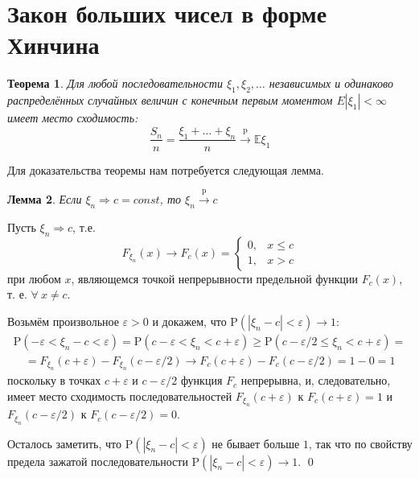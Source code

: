 \documentclass[oneside,final,14pt]{extreport}
\renewenvironment{proof}{{\bfseries Доказательство.}}{\qed}
\newtheorem{thm}{Теорема}[section]
\newtheorem{lem}[thm]{Лемма}
\theoremstyle{definition}
\begin{document}
\section{Закон больших чисел в форме Хинчина}
\begin{thm}
    Для любой последовательности $\xi_{1}, \xi_{2}, \ldots$ независимых и одинаково распределённых случайных величин с конечным первым моментом $E\left|\xi_{1}\right|<\infty$ имеет место сходимость:
    \begin{equation*}
        \frac{S_{n}}{n} = \frac{\xi_{1}+\ldots+\xi_{n}}{n} \xrightarrow[]{\text{p}} \mathbb{E} \xi_{1}
    \end{equation*}
\end{thm}
Для доказательства теоремы нам потребуется следующая лемма.
\begin{lem}
    Если $\xi_{n} \Rightarrow c=const$, то $\xi_{n} \stackrel{\mathrm{p}}{\longrightarrow} c$
\end{lem}
\begin{proof}
    Пусть $\xi_{n} \Rightarrow c$, т.е.
    \begin{equation*}
        F_{\xi_{n}}(x) \rightarrow F_{c}(x)=\left\{\begin{array}{ll}
        0, & x \leqslant c \\
        1, & x>c
        \end{array}\right.
    \end{equation*}
    при любом $x$, являющемся точкой непрерывности предельной функции $F_{c}(x)$, т. е. $\forall~ x \neq c$.
    
    Возьмём произвольное $\varepsilon>0$ и докажем, что $\mathrm{P}\left(\left|\xi_{n}-c\right|<\varepsilon\right) \rightarrow 1$:
    \begin{multline*}
        \mathrm{P}\left(-\varepsilon<\xi_{n}-c<\varepsilon\right)=\mathrm{P}\left(c-\varepsilon<\xi_{n}<c+\varepsilon\right) \geqslant \mathrm{P}\left(c-\varepsilon / 2 \leqslant \xi_{n}<c+\varepsilon\right)= \\
        \quad=F_{\xi_{n}}(c+\varepsilon)-F_{\xi_{n}}(c-\varepsilon / 2) \rightarrow F_{c}(c+\varepsilon)-F_{c}(c-\varepsilon / 2)=1-0=1
    \end{multline*}
    поскольку в точках $c+\varepsilon$ и $c-\varepsilon / 2$ функция $F_{c}$ непрерывна, и, следовательно, имеет место сходимость последовательностей $F_{\xi_{n}}(c+\varepsilon)$ к $F_{c}(c+\varepsilon)=1$ и $F_{\xi_{n}}(c-\varepsilon / 2)$ к $F_{c}(c-\varepsilon / 2)=0$.
    
    Осталось заметить, что $\mathrm{P}\left(\left|\xi_{n}-c\right|<\varepsilon\right)$ не бывает больше $1$, так что по свойству предела зажатой последовательности $\mathrm{P}\left(\left|\xi_{n}-c\right|<\varepsilon\right) \rightarrow 1$.
\end{proof}
\end{document}
